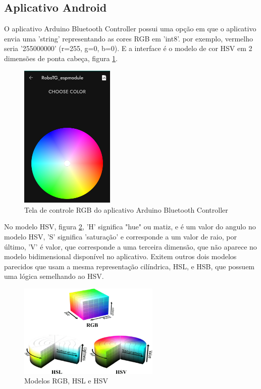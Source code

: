 \subsection{Aplicativo Android}

O aplicativo Arduino Bluetooth Controller possui uma opção em que o aplicativo envia uma 'string' representando as cores RGB em 'int8'.
por exemplo,  vermelho seria '255000000' (r=255, g=0, b=0). E a interface é o modelo de cor HSV em 2 dimensões de ponta cabeça,
figura \ref{arduino_bluetooth_controller_hsl_model}.


\begin{figure}[htb]
	\centering
	\includegraphics[width=0.40\textwidth]{figures/andriod_bluetooth_controller_hsl_model}
	\caption{Tela de controle RGB do aplicativo Arduino Bluetooth Controller}
	\label{arduino_bluetooth_controller_hsl_model}
\end{figure}

No modelo HSV,  figura  \ref{rbg_hsl_hsv}, 'H' significa "hue" ou matiz, e é um valor do angulo no modelo HSV, 'S' significa 'saturação' e corresponde a um valor de raio,
por último, 'V' é valor, que corresponde a uma terceira dimensão, que não aparece no modelo bidimensional disponível no aplicativo.
Exitem outros dois modelos parecidos que usam a mesma representação cilíndrica, HSL, e HSB, que possuem uma lógica semelhando ao HSV.


\begin{figure}[htb]
	\centering
	\includegraphics[width=0.6\textwidth]{figures/RBG_HSL_HSV}
	\caption{Modelos RGB, HSL e HSV \cite{rbg_hsl_hsv}}
	\label{rbg_hsl_hsv}
\end{figure}

